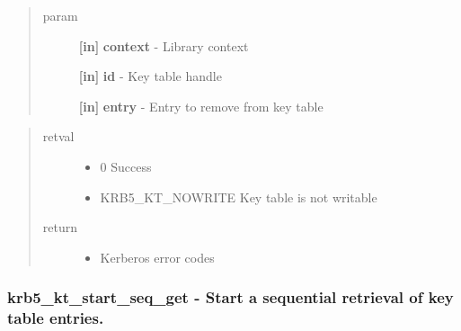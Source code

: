 \documentclass[letterpaper,10pt,english]{sphinxmanual}
\begin{document}
\begin{fulllineitems}
\label{appdev/refs/api/krb5_kt_remove_entry:krb5_kt_remove_entry}
\end{fulllineitems}

\begin{quote}\begin{description}
\item[{param}] \leavevmode
\textbf{{[}in{]}} \textbf{context} - Library context

\textbf{{[}in{]}} \textbf{id} - Key table handle

\textbf{{[}in{]}} \textbf{entry} - Entry to remove from key table

\end{description}\end{quote}
\begin{quote}\begin{description}
\item[{retval}] \leavevmode\begin{itemize}
\item {} 
0   Success

\item {} 
KRB5\_KT\_NOWRITE   Key table is not writable

\end{itemize}

\item[{return}] \leavevmode\begin{itemize}
\item {} 
Kerberos error codes

\end{itemize}

\end{description}\end{quote}


\subsubsection{krb5\_kt\_start\_seq\_get -  Start a sequential retrieval of key table entries.}
\label{appdev/refs/api/krb5_kt_start_seq_get:krb5-kt-start-seq-get-start-a-sequential-retrieval-of-key-table-entries}\label{appdev/refs/api/krb5_kt_start_seq_get::doc}
\end{document}
